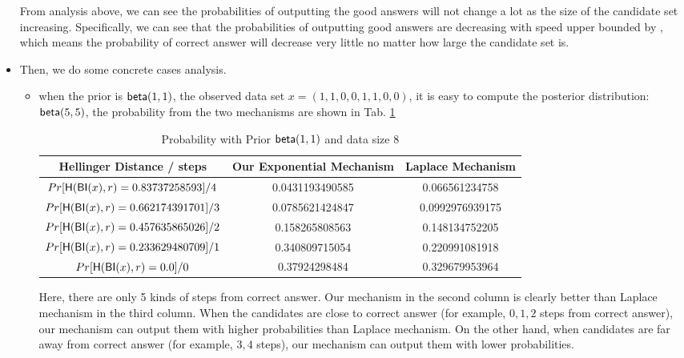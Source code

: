 \documentclass[sigconf]{acmart}
\begin{document}
\begin{itemize}
	From analysis above, we can see the probabilities of outputting the good answers will not change a lot as the size of the candidate set increasing. Specifically, we can see that the probabilities of outputting good answers are decreasing with speed upper bounded by , which means the probability of correct answer will decrease very little no matter how large the candidate set is. 

	\item Then, we do some concrete cases analysis.

	\begin{itemize}

		\item when the prior is $\mathsf{beta}(1,1)$, the observed data set $x = (1,1,0,0,1,1,0,0)$, it is easy to compute the posterior distribution: $\mathsf{beta}(5,5)$, the probability from the two mechanisms are shown in Tab. \ref{tab_8} 

		\begin{center}
		\begin{table}
		 \begin{tabular}{c | c | c} 
		 \hline
		 Hellinger Distance / steps & Our Exponential Mechanism & Laplace Mechanism  \\
		 \hline\hline
		 $Pr[\mathsf{H}(\mathsf{BI}(x), r) = 0.83737258593] / 4		$ & 0.0431193490585 & 0.066561234758\\ 
		 \hline
		 $Pr[\mathsf{H}(\mathsf{BI}(x), r) = 0.662174391701 ] / 3	$ & 0.0785621424847 & 0.0992976939175  \\
		 \hline
		 $Pr[\mathsf{H}(\mathsf{BI}(x), r) = 0.457635865026 ] / 2	$ & 0.158265808563 & 0.148134752205  \\
		 \hline
		 $Pr[\mathsf{H}(\mathsf{BI}(x), r) = 0.233629480709 ] / 1	$ & 0.340809715054 & 0.220991081918  \\
		 \hline
		 $Pr[\mathsf{H}(\mathsf{BI}(x), r) = 0.0 ] / 0 				$ & 0.37924298484 & 0.329679953964 \\
		 \hline
		\end{tabular}
		\caption{Probability with Prior $\mathsf{beta}(1,1)$ and data size $8$}
		\label{tab_8}
		\end{table}
		\end{center}

		Here, there are only 5 kinds of steps from correct answer. Our mechanism in the second column is clearly better than Laplace mechanism in the third column. When the candidates are close to correct answer (for example, $0, 1, 2$ steps from correct answer), our mechanism can output them with higher probabilities than Laplace mechanism. On the other hand, when candidates are far away from correct answer (for example, $3, 4$ steps), our mechanism can output them with lower probabilities.


\end{itemize}
\end{itemize}
\end{document}

